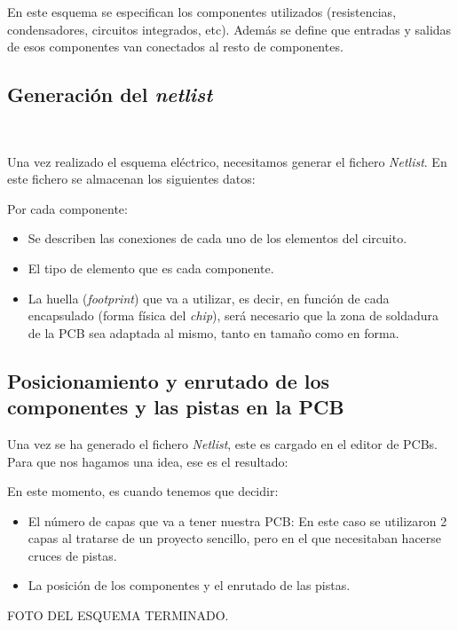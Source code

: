 En este esquema se especifican los componentes utilizados (resistencias, condensadores, circuitos integrados, etc). Además se define que entradas y salidas de esos componentes van conectados al resto de componentes.


\subsection{Generación del \emph{netlist}}\

Una vez realizado el esquema eléctrico, necesitamos generar el fichero \emph{Netlist}. En este fichero se almacenan los siguientes datos:

Por cada componente:

\begin{itemize}
\item
Se describen las conexiones de cada uno de los elementos del circuito.
\item
El tipo de elemento que es cada componente.
\item
La huella (\emph{footprint}) que va a utilizar, es decir, en función de cada encapsulado (forma física del \emph{chip}), será necesario que la zona de soldadura de la PCB sea adaptada al mismo, tanto en tamaño como en forma.
\end{itemize}


\subsection{Posicionamiento y enrutado de los componentes y las pistas en la PCB}\label{posicionamiento_y_enrutado_de_los_componentes_y_las_pistas_en_la_pcb}

Una vez se ha generado el fichero \emph{Netlist}, este es cargado en el editor de PCBs. Para que nos hagamos una idea, ese es el resultado:


En este momento, es cuando tenemos que decidir:

\begin{itemize}
\item
El número de capas que va a tener nuestra PCB: En este caso se utilizaron 2 capas al tratarse de un proyecto sencillo, pero en el que necesitaban hacerse cruces de pistas.
\item
La posición de los componentes y el enrutado de las pistas.
\end{itemize}

FOTO DEL ESQUEMA TERMINADO.


